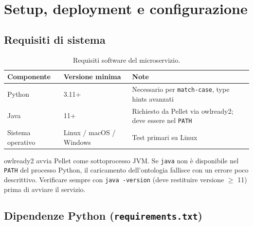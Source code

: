 \documentclass[a4paper,12pt]{article}
\begin{document}
\section{Setup, deployment e configurazione}

\subsection{Requisiti di sistema}

\begin{table}[H]
\centering
\caption{Requisiti software del microservizio.}
\begin{tabular}{L{4cm} L{3.5cm} L{5cm}}
\toprule
\textbf{Componente} & \textbf{Versione minima} & \textbf{Note} \\
\midrule
Python & 3.11+ & Necessario per \texttt{match-case}, type hints avanzati \\
Java & 11+ & Richiesto da Pellet via owlready2; deve essere nel \texttt{PATH} \\
Sistema operativo & Linux / macOS / Windows & Test primari su Linux \\
\bottomrule
\end{tabular}
\end{table}

\begin{warningbox}
owlready2 avvia Pellet come sottoprocesso JVM. Se \texttt{java} non \`{e}
disponibile nel \texttt{PATH} del processo Python, il caricamento
dell'ontologia fallisce con un errore poco descrittivo. Verificare
sempre con \texttt{java -version} (deve restituire versione $\geq$ 11)
prima di avviare il servizio.
\end{warningbox}

\subsection{Dipendenze Python (\texttt{requirements.txt})}
\end{document}
